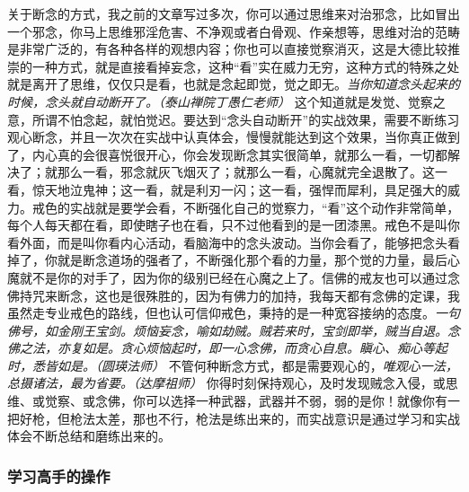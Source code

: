 关于断念的方式，我之前的文章写过多次，你可以通过思维来对治邪念，比如冒出一个邪念，你马上思维邪淫危害、不净观或者白骨观、作亲想等，思维对治的范畴是非常广泛的，有各种各样的观想内容；你也可以直接觉察消灭，这是大德比较推崇的一种方式，就是直接看掉妄念，这种“看”实在威力无穷，这种方式的特殊之处就是离开了思维，仅仅只是看，也就是念起即觉，觉之即无。\textit{当你知道念头起来的时候，念头就自动断开了。（泰山禅院丁愚仁老师）} 这个知道就是发觉、觉察之意，所谓不怕念起，就怕觉迟。要达到“念头自动断开”的实战效果，需要不断练习观心断念，并且一次次在实战中认真体会，慢慢就能达到这个效果，当你真正做到了，内心真的会很喜悦很开心，你会发现断念其实很简单，就那么一看，一切都解决了；就那么一看，邪念就灰飞烟灭了；就那么一看，心魔就完全退散了。这一看，惊天地泣鬼神；这一看，就是利刃一闪；这一看，强悍而犀利，具足强大的威力。戒色的实战就是要学会看，不断强化自己的觉察力，“看”这个动作非常简单，每个人每天都在看，即使瞎子也在看，只不过他看到的是一团漆黑。戒色不是叫你看外面，而是叫你看内心活动，看脑海中的念头波动。当你会看了，能够把念头看掉了，你就是断念道场的强者了，不断强化那个看的力量，那个觉的力量，最后心魔就不是你的对手了，因为你的级别已经在心魔之上了。信佛的戒友也可以通过念佛持咒来断念，这也是很殊胜的，因为有佛力的加持，我每天都有念佛的定课，我虽然走专业戒色的路线，但也认可信仰戒色，秉持的是一种宽容接纳的态度。\textit{一句佛号，如金刚王宝剑。烦恼妄念，喻如劫贼。贼若来时，宝剑即举，贼当自退。念佛之法，亦复如是。贪心烦恼起时，即一心念佛，而贪心自息。瞋心、痴心等起时，悉皆如是。（圆瑛法师）} 不管何种断念方式，都是需要观心的，\textit{唯观心一法，总摄诸法，最为省要。（达摩祖师）} 你得时刻保持观心，及时发现贼念入侵，或思维、或觉察、或念佛，你可以选择一种武器，武器并不弱，弱的是你！就像你有一把好枪，但枪法太差，那也不行，枪法是练出来的，而实战意识是通过学习和实战体会不断总结和磨练出来的。

\subsubsection{学习高手的操作}

